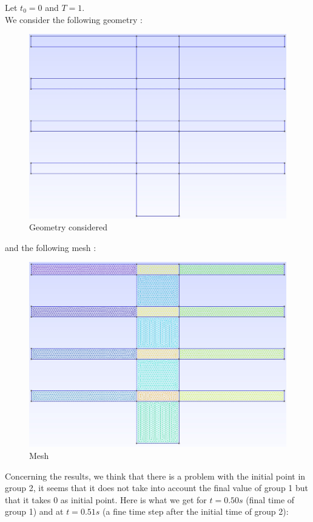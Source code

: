 \noindent Let $t_0=0$ and $T=1$. \\
We consider the following geometry :
\begin{figure}[H]
	\centering
	\includegraphics[width=0.3\linewidth]{"images/parareal/feelpp/heat_geo.jpg"}
	\caption{Geometry considered}
\end{figure}
\noindent and the following mesh :
\begin{figure}[H]
	\centering
	\includegraphics[width=0.3\linewidth]{"images/parareal/feelpp/heat_mesh.jpg"}
	\caption{Mesh}
\end{figure}
\noindent Concerning the results, we think that there is a problem with the initial point in group 2, it seems that it does not take into account the final value of group 1 but that it takes 0 as initial point. Here is what we get for $t=0.50s$ (final time of group 1) and at $t=0.51s$ (a fine time step after the initial time of group 2):
